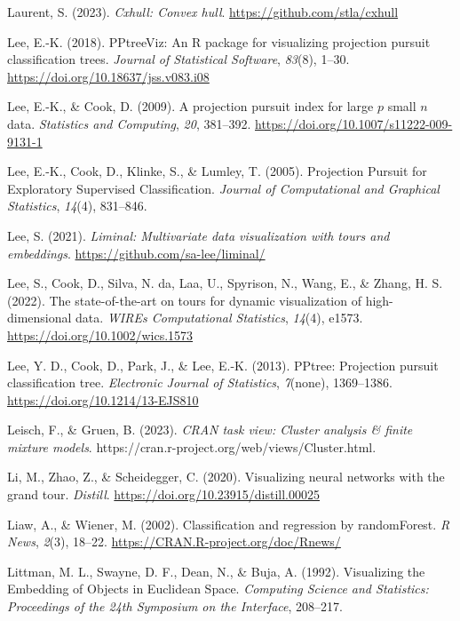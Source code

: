 \documentclass[
  letterpaper,
]{krantz}
\newlength{\cslhangindent}
\newenvironment{CSLReferences}[2] %
 {\begin{list}{}{%
  \setlength{\itemindent}{0pt}
  \setlength{\leftmargin}{0pt}
  \setlength{\parsep}{0pt}
  \ifodd #1
   \setlength{\leftmargin}{\cslhangindent}
   \setlength{\itemindent}{-1\cslhangindent}
  \fi
  \setlength{\itemsep}{#2\baselineskip}}}
 {\end{list}}
\begin{document}
\begin{CSLReferences}{1}{0}
Laurent, S. (2023). \emph{Cxhull: Convex hull}.
\url{https://github.com/stla/cxhull}

Lee, E.-K. (2018). PPtreeViz: An {R} package for visualizing projection
pursuit classification trees. \emph{Journal of Statistical Software},
\emph{83}(8), 1--30. \url{https://doi.org/10.18637/jss.v083.i08}

Lee, E.-K., \& Cook, D. (2009). A projection pursuit index for large
\(p\) small \(n\) data. \emph{Statistics and Computing}, \emph{20},
381--392. \url{https://doi.org/10.1007/s11222-009-9131-1}

Lee, E.-K., Cook, D., Klinke, S., \& Lumley, T. (2005). {P}rojection
{P}ursuit for {E}xploratory {S}upervised {C}lassification. \emph{Journal
of Computational and Graphical Statistics}, \emph{14}(4), 831--846.

Lee, S. (2021). \emph{Liminal: Multivariate data visualization with
tours and embeddings}. \url{https://github.com/sa-lee/liminal/}

Lee, S., Cook, D., Silva, N. da, Laa, U., Spyrison, N., Wang, E., \&
Zhang, H. S. (2022). The state-of-the-art on tours for dynamic
visualization of high-dimensional data. \emph{WIREs Computational
Statistics}, \emph{14}(4), e1573.
\url{https://doi.org/10.1002/wics.1573}

Lee, Y. D., Cook, D., Park, J., \& Lee, E.-K. (2013). {PPtree:
Projection pursuit classification tree}. \emph{Electronic Journal of
Statistics}, \emph{7}(none), 1369--1386.
\url{https://doi.org/10.1214/13-EJS810}

Leisch, F., \& Gruen, B. (2023). \emph{CRAN task view: Cluster analysis
\& finite mixture models}.
https://cran.r-project.org/web/views/Cluster.html.

Li, M., Zhao, Z., \& Scheidegger, C. (2020). Visualizing neural networks
with the grand tour. \emph{Distill}.
\url{https://doi.org/10.23915/distill.00025}

Liaw, A., \& Wiener, M. (2002). Classification and regression by
randomForest. \emph{R News}, \emph{2}(3), 18--22.
\url{https://CRAN.R-project.org/doc/Rnews/}

Littman, M. L., Swayne, D. F., Dean, N., \& Buja, A. (1992). Visualizing
the {E}mbedding of {O}bjects in {E}uclidean {S}pace. \emph{Computing
Science and Statistics: Proceedings of the 24th Symposium on the
Interface}, 208--217.


\end{CSLReferences}
\end{document}
